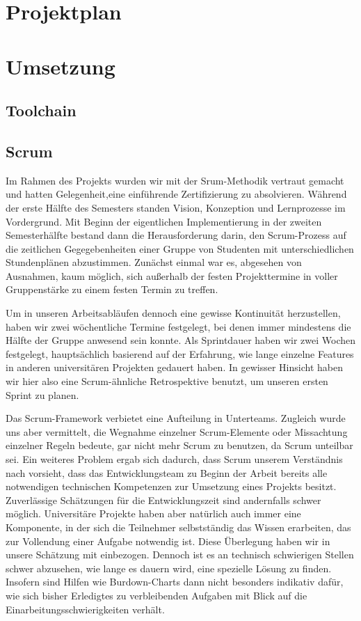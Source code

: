 \documentclass[a4paper, 12pt]{scrartcl}
\begin{document}
    \section{Projektplan}

    \section{Umsetzung}
    \subsection{Toolchain}
    
    \subsection{Scrum}
    Im Rahmen des Projekts wurden wir mit der Srum-Methodik vertraut gemacht und hatten Gelegenheit,eine einführende Zertifizierung zu absolvieren. Während der erste Hälfte des Semesters standen Vision, Konzeption und Lernprozesse im Vordergrund. Mit Beginn der eigentlichen Implementierung in der zweiten Semesterhälfte bestand dann die Herausforderung darin, den Scrum-Prozess auf die zeitlichen Gegegebenheiten einer Gruppe von Studenten mit unterschiedlichen Stundenplänen abzustimmen. Zunächst einmal war es, abgesehen von Ausnahmen, kaum möglich, sich außerhalb der festen Projekttermine in voller Gruppenstärke zu einem festen Termin zu treffen. 
    
    Um in unseren Arbeitsabläufen dennoch eine gewisse Kontinuität herzustellen, haben wir zwei wöchentliche Termine festgelegt, bei denen immer mindestens die Hälfte der Gruppe anwesend sein konnte. Als Sprintdauer haben wir zwei Wochen festgelegt, hauptsächlich basierend auf der Erfahrung, wie lange einzelne Features in anderen universitären Projekten gedauert haben. In gewisser Hinsicht haben wir hier also eine Scrum-ähnliche Retrospektive benutzt, um unseren ersten Sprint zu planen.
    
    Das Scrum-Framework verbietet eine Aufteilung in Unterteams. Zugleich wurde uns aber vermittelt, die Wegnahme einzelner Scrum-Elemente oder Missachtung einzelner Regeln bedeute, gar nicht mehr Scrum zu benutzen, da Scrum unteilbar sei. Ein weiteres Problem ergab sich dadurch, dass Scrum unserem Verständnis nach vorsieht, dass das Entwicklungsteam zu Beginn der Arbeit bereits alle notwendigen technischen Kompetenzen zur Umsetzung eines Projekts besitzt. Zuverlässige Schätzungen für die Entwicklungszeit sind andernfalls schwer möglich. Universitäre Projekte haben aber natürlich auch immer eine Komponente, in der sich die Teilnehmer selbstständig das Wissen erarbeiten, das zur Vollendung einer Aufgabe notwendig ist. Diese Überlegung haben wir in unsere Schätzung mit einbezogen. Dennoch ist es an technisch schwierigen Stellen schwer abzusehen, wie lange es dauern wird, eine spezielle Lösung zu finden. Insofern sind Hilfen wie Burdown-Charts dann nicht besonders indikativ dafür, wie sich bisher Erledigtes zu verbleibenden Aufgaben mit Blick auf die Einarbeitungsschwierigkeiten verhält.
\end{document}
